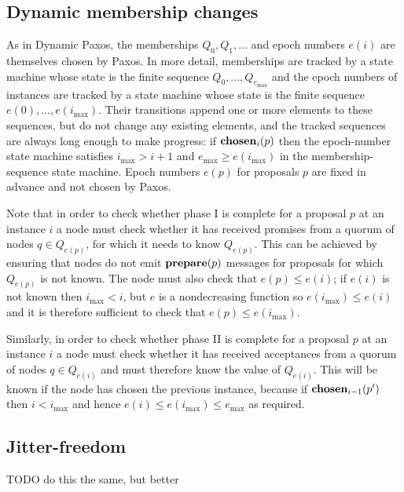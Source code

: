 \documentclass[journal]{IEEEtran}
\begin{document}
\subsection{Dynamic membership changes}

As in Dynamic Paxos, the memberships $Q_0, Q_1, \ldots$ and epoch numbers
$e(i)$ are themselves chosen by Paxos. In more detail, memberships are tracked
by a state machine whose state is the finite sequence $Q_0, \ldots,
Q_{e_\mathrm{max}}$ and the epoch numbers of instances are tracked by a state
machine whose state is the finite sequence $e(0), \ldots, e(i_\mathrm{max})$.
Their transitions append one or more elements to these sequences, but do not
change any existing elements, and the tracked sequences are always long enough
to make progress: if $\mathbf{chosen}_{i}(p)$ then the epoch-number state machine
satisfies $i_\mathrm{max} > i+1$ and $e_\mathrm{max} \ge e(i_\mathrm{max})$ in
the membership-sequence state machine. Epoch numbers $e(p)$ for proposals $p$
are fixed in advance and not chosen by Paxos.

Note that in order to check whether phase I is complete for a proposal $p$ at
an instance $i$ a node must check whether it has received promises from a
quorum of nodes $q \in Q_{e(p)}$, for which it needs to know $Q_{e(p)}$. This
can be achieved by ensuring that nodes do not emit $\mathbf{prepare}(p)$ messages for
proposals for which $Q_{e(p)}$ is not known. The node must also check that
$e(p) \le e(i)$; if $e(i)$ is not known then $i_\mathrm{max} < i$, but $e$ is a
nondecreasing function so $e(i_\mathrm{max}) \le e(i)$ and it is therefore
sufficient to check that $e(p) \le e(i_\mathrm{max})$.

Similarly, in order to check whether phase II is complete for a proposal $p$ at
an instance $i$ a node must check whether it has received acceptances from a
quorum of nodes $q \in Q_{e(i)}$ and must therefore know the value of
$Q_{e(i)}$. This will be known if the node has chosen the previous instance,
because if $\mathbf{chosen}_{i-1}(p')$ then $i < i_\mathrm{max}$ and hence ${e(i) \le
e(i_\mathrm{max}) \le e_\mathrm{max}}$ as required.

\subsection{Jitter-freedom}

TODO do this the same, but better
\end{document}

